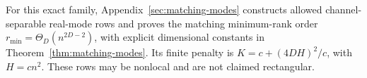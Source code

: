 For this exact family, Appendix~\ref{sec:matching-modes} constructs allowed
channel-separable real-mode rows and proves the matching minimum-rank order
$r_{\min}=\Theta_D(n^{2D-2})$, with explicit dimensional constants in
Theorem~\ref{thm:matching-modes}. Its finite penalty is
$K=c+(4DH)^2/c$, with $H=cn^2$. These rows may be nonlocal and are not claimed rectangular.
